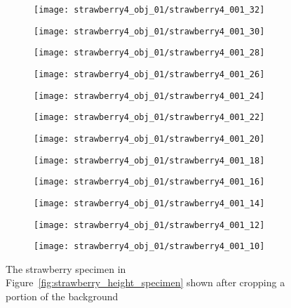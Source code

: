 \begin{figure*}
  \centering
  \begin{subfigure}[]{0.12\textwidth}
      \texttt{[image: strawberry4\_obj\_01/strawberry4\_001\_32]}
      \caption{}
  \end{subfigure}
  \begin{subfigure}[]{0.12\textwidth}
      \texttt{[image: strawberry4\_obj\_01/strawberry4\_001\_30]}
      \caption{}
  \end{subfigure}
  \begin{subfigure}[]{0.12\textwidth}
      \texttt{[image: strawberry4\_obj\_01/strawberry4\_001\_28]}
      \caption{}
  \end{subfigure}
  \begin{subfigure}[]{0.12\textwidth}
      \texttt{[image: strawberry4\_obj\_01/strawberry4\_001\_26]}
      \caption{}
  \end{subfigure}
  \begin{subfigure}[]{0.12\textwidth}
      \texttt{[image: strawberry4\_obj\_01/strawberry4\_001\_24]}
      \caption{}
  \end{subfigure}
  \begin{subfigure}[]{0.12\textwidth}
      \texttt{[image: strawberry4\_obj\_01/strawberry4\_001\_22]}
      \caption{}
  \end{subfigure}
  \begin{subfigure}[]{0.12\textwidth}
      \texttt{[image: strawberry4\_obj\_01/strawberry4\_001\_20]}
      \caption{}
  \end{subfigure}
  \begin{subfigure}[]{0.12\textwidth}
      \texttt{[image: strawberry4\_obj\_01/strawberry4\_001\_18]}
      \caption{}
  \end{subfigure}
  \begin{subfigure}[]{0.12\textwidth}
      \texttt{[image: strawberry4\_obj\_01/strawberry4\_001\_16]}
      \caption{}
  \end{subfigure}
  \begin{subfigure}[]{0.12\textwidth}
      \texttt{[image: strawberry4\_obj\_01/strawberry4\_001\_14]}
      \caption{}
  \end{subfigure}
  \begin{subfigure}[]{0.12\textwidth}
      \texttt{[image: strawberry4\_obj\_01/strawberry4\_001\_12]}
      \caption{}
  \end{subfigure}
  \begin{subfigure}[]{0.12\textwidth}
      \texttt{[image: strawberry4\_obj\_01/strawberry4\_001\_10]}
      \caption{}
  \end{subfigure}
\caption[Images of a strawberry specimen after cropping a portion of background]{The strawberry specimen in Figure~\ref{fig:strawberry_height_specimen} shown after cropping a portion of the background}
\label{fig:strawberry_height_specimen_cropped}
\end{figure*}	

